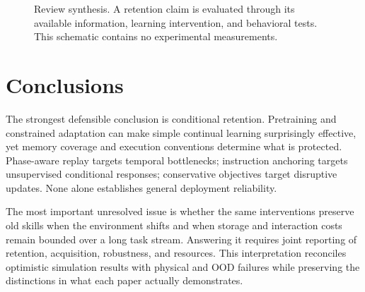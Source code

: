 \documentclass[11pt,a4paper]{article}
\begin{document}
\begin{figure}[htbp]
\centering
{}
\caption{Review synthesis. A retention claim is evaluated through its available information, learning intervention, and behavioral tests. This schematic contains no experimental measurements.}
\end{figure}

\section{Conclusions}
The strongest defensible conclusion is conditional retention. Pretraining and constrained adaptation can make simple continual learning surprisingly effective, yet memory coverage and execution conventions determine what is protected. Phase-aware replay targets temporal bottlenecks; instruction anchoring targets unsupervised conditional responses; conservative objectives target disruptive updates. None alone establishes general deployment reliability.

The most important unresolved issue is whether the same interventions preserve old skills when the environment shifts and when storage and interaction costs remain bounded over a long task stream. Answering it requires joint reporting of retention, acquisition, robustness, and resources. This interpretation reconciles optimistic simulation results with physical and OOD failures while preserving the distinctions in what each paper actually demonstrates.




\end{document}
